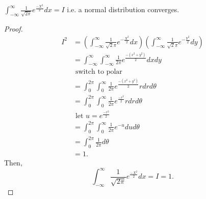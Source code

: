 \documentclass[a4paper]{article}
\begin{document}
\begin{theorem}
  $\int_{-\infty}^{\infty} \frac{1}{\sqrt{2 \pi}} e^{\frac{-X^{2}}{2}} dx = I$ i.e. a normal distribution converges.
  \begin{proof}
    \begin{align*}
      I^{2} &= \left( \int_{-\infty}^{\infty} \frac{1}{\sqrt{2} \pi} e^{-\frac{X^{2}}{2}} dx \right) \left(   \int_{-\infty}^{\infty} \frac{1}{\sqrt{2} \pi} e^{-\frac{Y^{2}}{2}} dy \right) \\
            &= \int_{-\infty}^{\infty} \int_{-\infty}^{\infty}  \frac{1}{2 \pi} e^{\frac{-(x^{2} + y^{2})}{2}} dx dy \\
            &\text{ switch to polar} \\
              &= \int_{0}^{2 \pi} \int_{0}^{\infty}  \frac{1}{2 \pi} e^{\frac{-(x^{2} + y^{2})}{2}} r  dr d\theta \\
              &= \int_{0}^{2 \pi} \int_{0}^{\infty}  \frac{1}{2 \pi} e^{\frac{-r^{2}}{2}} r  dr d\theta \\
              &\text{ let $u = e^{\frac{-r^{2}}{2}}$ }\\
              &= \int_{0}^{2 \pi} \int_{0}^{\infty}  \frac{1}{2 \pi} e^{-u} du d\theta\\
              &= \int_{0}^{2\pi} \frac{1}{2\pi} d\theta \\
              &= 1
    .\end{align*}
    Then,
    \[
    \int_{-\infty}^{\infty} \frac{1}{\sqrt{2 \pi}} e^{\frac{-X^{2}}{2}} dx = I  = 1
    .\] 
  \end{proof}
\end{theorem}
\end{document}
